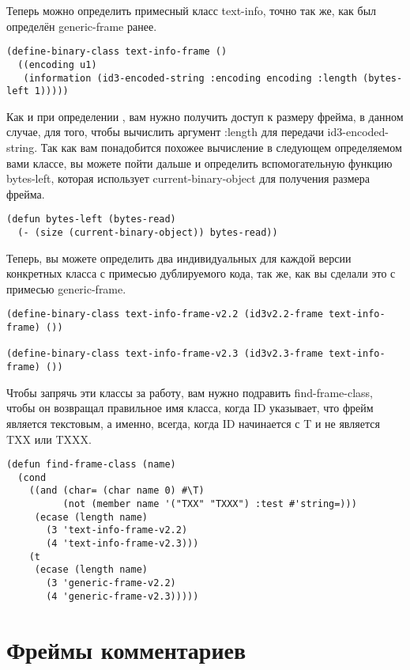 Теперь можно определить примесный класс text-info, точно так же, как был определён
generic-frame ранее.

\begin{lstlisting}
(define-binary-class text-info-frame ()
  ((encoding u1)
   (information (id3-encoded-string :encoding encoding :length (bytes-left 1)))))
\end{lstlisting}

Как и при определении , вам нужно получить доступ к размеру фрейма, в
данном случае, для того, чтобы вычислить аргумент :length для передачи
id3-encoded-string. Так как вам понадобится похожее вычисление в следующем определяемом
вами классе, вы можете пойти дальше и определить вспомогательную функцию bytes-left,
которая использует current-binary-object для получения размера фрейма.

\begin{lstlisting}
(defun bytes-left (bytes-read)
  (- (size (current-binary-object)) bytes-read))
\end{lstlisting}

Теперь, вы можете определить два индивидуальных для каждой версии конкретных класса с
примесью дублируемого кода, так же, как вы сделали это с примесью generic-frame.

\begin{lstlisting}
(define-binary-class text-info-frame-v2.2 (id3v2.2-frame text-info-frame) ())

(define-binary-class text-info-frame-v2.3 (id3v2.3-frame text-info-frame) ())
\end{lstlisting}

Чтобы запрячь эти классы за работу, вам нужно подравить find-frame-class, чтобы он
возвращал правильное имя класса, когда ID указывает, что фрейм является текстовым, а
именно, всегда, когда ID начинается с T и не является TXX или TXXX.

\begin{lstlisting}
(defun find-frame-class (name)
  (cond
    ((and (char= (char name 0) #\T)
          (not (member name '("TXX" "TXXX") :test #'string=)))
     (ecase (length name)
       (3 'text-info-frame-v2.2)
       (4 'text-info-frame-v2.3)))
    (t
     (ecase (length name)
       (3 'generic-frame-v2.2)
       (4 'generic-frame-v2.3)))))
\end{lstlisting}

\section{Фреймы комментариев}

